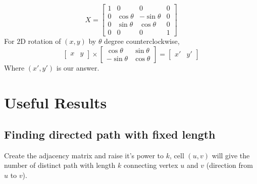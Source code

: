 \documentclass[8pt, a4paper, twocolumn]{article}
\begin{document}
\begin{equation*}
X=\begin{bmatrix}
1 & 0 & 0 & 0\\
0 & \cos\theta & -\sin\theta & 0\\
0 & \sin\theta & \cos\theta & 0\\
0 & 0 & 0 & 1
\end{bmatrix}
\end{equation*}
For $2$D rotation of $(x,y)$ by $\theta$ degree counterclockwise,
\begin{equation*}
\begin{bmatrix}
x & y
\end{bmatrix}\times\begin{bmatrix}
\cos\theta & \sin\theta \\
-\sin\theta & \cos\theta
\end{bmatrix}=\begin{bmatrix}
x' & y'
\end{bmatrix}
\end{equation*}
Where $(x',y')$ is our answer.
\section{Useful Results}
\subsection{Finding directed path with fixed length}
Create the adjacency matrix and raise it's power to $k$, cell $(u,v)$ will give the number of distinct path with length $k$ connecting vertex $u$ and $v$ (direction from $u$ to $v$).
\end{document}
